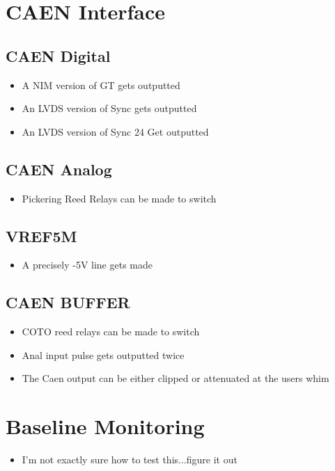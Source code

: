 \documentclass[11pt,a4paper]{article}
\begin{document}
\section{CAEN Interface}
\subsection{CAEN Digital}
\begin{itemize}
\item A NIM version of GT gets outputted
\item An LVDS version of Sync gets outputted
\item An LVDS version of Sync 24 Get outputted
\end{itemize}
\subsection{CAEN Analog}
\begin{itemize}
\item Pickering Reed Relays can be made to switch
\end{itemize}
\subsection{VREF5M}
\begin{itemize}
\item A precisely -5V line gets made
\end{itemize}
\subsection{CAEN BUFFER} 
\begin{itemize}
\item COTO reed relays can be made to switch
\item Anal input pulse gets outputted twice
\item The Caen output can be either clipped or attenuated at the users whim
\end{itemize}
\section{Baseline Monitoring}
\begin{itemize}
\item I'm not exactly sure how to test this...figure it out
\end{itemize}
\end{document}
